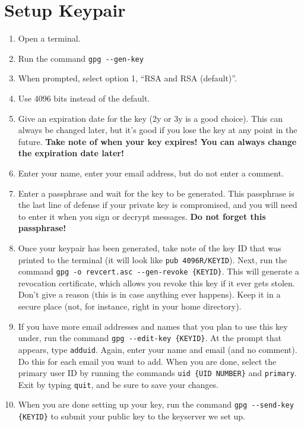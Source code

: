 \documentclass{article}
\begin{document}
\section*{Setup Keypair}

\begin{enumerate}
\item Open a terminal.
\item Run the command \texttt{gpg -{}-gen-key}
\item When prompted, select option 1, ``RSA and RSA (default)''.
\item Use 4096 bits instead of the default.
\item Give an expiration date for the key (2y or 3y is a good choice).
  This can always be changed later, but it's good if you lose the key
  at any point in the future.  \textbf{Take note of when your key
    expires!  You can always change the expiration date later!}
\item Enter your name, enter your email address, but do not enter a
  comment.
\item Enter a passphrase and wait for the key to be generated.  This
  passphrase is the last line of defense if your private key is
  compromised, and you will need to enter it when you sign or decrypt
  messages.  \textbf{Do not forget this passphrase!}
\item Once your keypair has been generated, take note of the key ID
  that was printed to the terminal (it will look like \texttt{pub
    4096R/KEYID}).  Next, run the command \texttt{gpg -o revcert.asc
    -{}-gen-revoke \{KEYID\}}.  This will generate a revocation
  certificate, which allows you revoke this key if it ever gets
  stolen.  Don't give a reason (this is in case anything ever
  happens).  Keep it in a secure place (not, for instance, right in
  your home directory).
\item If you have more email addresses and names that you plan to use
  this key under, run the command \texttt{gpg -{}-edit-key \{KEYID\}}.
  At the prompt that appears, type \texttt{adduid}.  Again, enter your
  name and email (and no comment).  Do this for each email you want to
  add.  When you are done, select the primary user ID by running the
  commands \texttt{uid \{UID NUMBER\}} and \texttt{primary}.  Exit by
  typing \texttt{quit}, and be sure to save your changes.
\item When you are done setting up your key, run the command
  \texttt{gpg -{}-send-key \{KEYID\}} to submit your public key to the
  keyserver we set up.
\end{enumerate}
\end{document}
